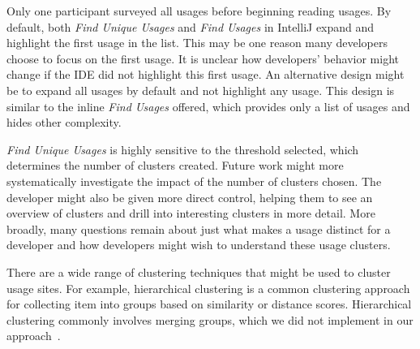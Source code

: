 \documentclass[conference]{IEEEtran}
\begin{document}
Only one participant surveyed all usages before beginning reading usages. By default, both \textit{Find Unique Usages} and \textit{Find Usages} in IntelliJ expand and highlight the first usage in the list. This may be one reason many developers choose to focus on the first usage. It is unclear how developers' behavior might change if the IDE did not highlight this first usage. An alternative design might be to expand all usages by default and not highlight any usage. 
This design is similar to the inline \textit{Find Usages} offered, which provides only a list of usages and hides other complexity. \par


\textit{Find Unique Usages} is highly sensitive to the threshold selected, which determines the number of clusters created. Future work might more systematically investigate the impact of the number of clusters chosen. The developer might also be given more direct control, helping them to see an overview of clusters and drill into interesting clusters in more detail.
More broadly, many questions remain about just what makes a usage distinct for a developer and how developers might wish to understand these usage clusters.\par


 
There are a wide range of clustering techniques that might be used to cluster usage sites. For example, hierarchical clustering is a common clustering approach for collecting item into groups based on similarity or distance scores.  Hierarchical clustering commonly involves merging groups, which we did not implement in our approach~\cite{shanmughasundaram2015measurement,day1984efficient,davidson2005agglomerative}. \par
\end{document}
